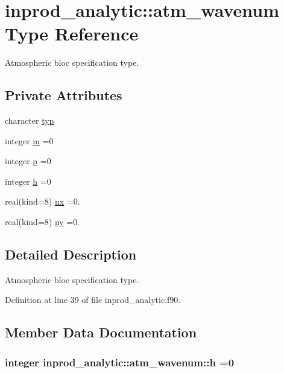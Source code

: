 \hypertarget{structinprod__analytic_1_1atm__wavenum}{\section{inprod\-\_\-analytic\-:\-:atm\-\_\-wavenum Type Reference}
\label{structinprod__analytic_1_1atm__wavenum}
}


Atmospheric bloc specification type.  


\subsection*{Private Attributes}
\begin{DoxyCompactItemize}
\item 
character \hyperlink{structinprod__analytic_1_1atm__wavenum_a1c12be211e96c5a773aae4c2146a3792}{typ}
\item 
integer \hyperlink{structinprod__analytic_1_1atm__wavenum_a72be0a86c5f5801b88ebf78506523bd2}{m} =0
\item 
integer \hyperlink{structinprod__analytic_1_1atm__wavenum_a5a938641d8939931bc4eb71499298a6a}{p} =0
\item 
integer \hyperlink{structinprod__analytic_1_1atm__wavenum_aa7df1690e97e43365ca0c2b1222924b5}{h} =0
\item 
real(kind=8) \hyperlink{structinprod__analytic_1_1atm__wavenum_ad67bf9989f5524b1f97dc7211ef78db2}{nx} =0.
\item 
real(kind=8) \hyperlink{structinprod__analytic_1_1atm__wavenum_af75974631175c67689c588f6d92ceb3e}{ny} =0.
\end{DoxyCompactItemize}


\subsection{Detailed Description}
Atmospheric bloc specification type. 

Definition at line 39 of file inprod\-\_\-analytic.\-f90.



\subsection{Member Data Documentation}
\hypertarget{structinprod__analytic_1_1atm__wavenum_aa7df1690e97e43365ca0c2b1222924b5}{
\subsubsection[{h}]{\setlength{\rightskip}{0pt plus 5cm}integer inprod\-\_\-analytic\-::atm\-\_\-wavenum\-::h =0\hspace{0.3cm}{\ttfamily [private]}}}\label{structinprod__analytic_1_1atm__wavenum_aa7df1690e97e43365ca0c2b1222924b5}


